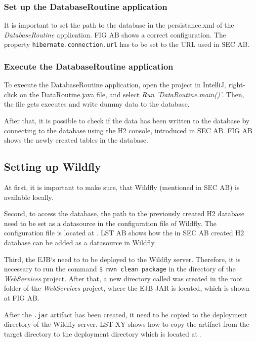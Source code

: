 \subsubsection{Set up the DatabaseRoutine application}
It is important to set the path to the database in the persistance.xml of the \textit{DatabaseRoutine} application. FIG AB shows a correct configuration. The property \texttt{hibernate.connection.url} has to be set to the URL used in SEC AB.

\subsubsection{Execute the DatabaseRoutine application}
To execute the DatabaseRoutine application, open the project in IntelliJ, right-click on the DataRoutine.java file, and select \textit{Run 'DataRoutine.main()'}. Then, the file gets executes and write dummy data to the database.

After that, it is possible to check if the data has been written to the database by connecting to the database using the H2 console, introduced in SEC AB. FIG AB shows the newly created tables in the database.



\subsection{Setting up Wildfly}
At first, it is important to make sure, that Wildfly (mentioned in SEC AB) is available locally.

Second, to access the database, the path to the previously created H2 database need to be set as a datasource in the configuration file of Wildfly. The configuration file is located at . LST AB shows how the in SEC AB created H2 database can be added as a datasource in Wildfly.

Third, the EJB`s need to to be deployed to the Wildfly server. Therefore, it is necessary to run the command \texttt{\$ mvn clean package} in the directory of the \textit{WebServices} project. After that, a new directory called  was created in the root folder of the \textit{WebServices} project, where the EJB JAR  is located, which is shown at FIG AB.

After the \texttt{.jar} artifact has been created, it need to be copied to the deployment directory of the Wildfly server. LST XY shows how to copy the artifact from the target directory to the deployment directory which is located at .


